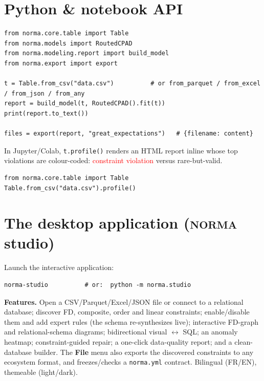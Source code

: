 \documentclass[11pt,a4paper]{article}
\newcommand{\norma}{\textsc{norma}}
\newcommand{\code}[1]{\texttt{#1}}
\begin{document}
\section{Python \& notebook API}
\begin{lstlisting}[style=py]
from norma.core.table import Table
from norma.models import RoutedCPAD
from norma.modeling.report import build_model
from norma.export import export

t = Table.from_csv("data.csv")          # or from_parquet / from_excel / from_json / from_any
report = build_model(t, RoutedCPAD().fit(t))
print(report.to_text())

files = export(report, "great_expectations")   # {filename: content}
\end{lstlisting}

\noindent In Jupyter/Colab, \code{t.profile()} renders an HTML report inline whose top
violations are colour-coded: \textcolor{red}{constraint violation} versus
\textcolor{orange!80!black}{rare-but-valid}.
\begin{lstlisting}[style=py]
from norma.core.table import Table
Table.from_csv("data.csv").profile()
\end{lstlisting}

\section{The desktop application (\norma{} studio)}
Launch the interactive application:
\begin{lstlisting}
norma-studio          # or:  python -m norma.studio
\end{lstlisting}
\textbf{Features.} Open a CSV/Parquet/Excel/JSON file or connect to a relational database;
discover FD, composite, order and linear constraints; enable/disable them and add expert
rules (the schema re-synthesizes live); interactive FD-graph and relational-schema diagrams;
bidirectional visual $\leftrightarrow$ SQL; an anomaly heatmap; constraint-guided repair;
a one-click data-quality report; and a clean-database builder. The \textbf{File} menu also
exports the discovered constraints to any ecosystem format, and freezes/checks a
\code{norma.yml} contract. Bilingual (FR/EN), themeable (light/dark).

\end{document}
